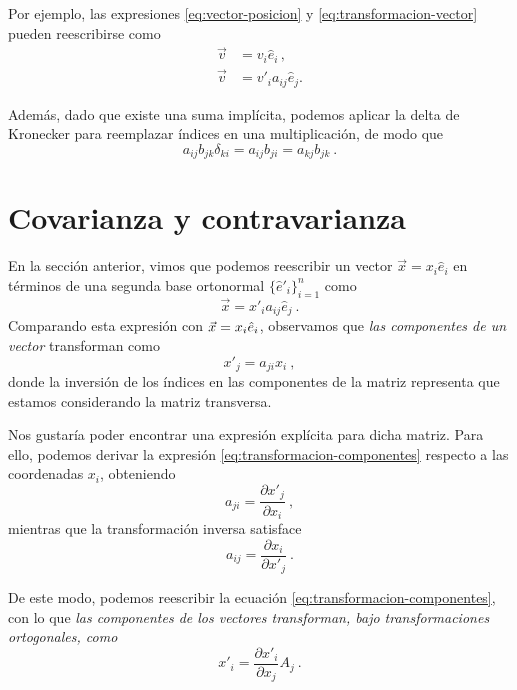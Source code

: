Por ejemplo, las expresiones \eqref{eq:vector-posicion} y \eqref{eq:transformacion-vector} pueden reescribirse como
\begin{align}
    \vec{v} & = v_i \hat{e}_i \, , \\
    \vec{v} & = v'_i a_{ij} \hat{e}_j .
\end{align}

Además, dado que existe una suma implícita, podemos aplicar la delta de Kronecker para reemplazar índices en una multiplicación, de modo que
\begin{equation}
    a_{ij} b_{jk} \delta_{ki} = a_{ij} b_{ji} = a_{kj} b_{jk} \ .
\end{equation}

\section{Covarianza y contravarianza}

En la sección anterior, vimos que podemos reescribir un vector $\vec{x} = x_i \hat{e}_i$ en términos de una segunda base ortonormal $\{\hat{e}'_i\}_{i=1}^n$ como
\begin{equation} \label{eq:transformacion-vector-einstein}
    \vec{x} = x'_i a_{ij} \hat{e}_j \ .
\end{equation}
Comparando esta expresión con $\vec{x} = x_i \hat{e}_i$, observamos que \emph{las componentes de un vector} transforman como
\begin{equation} \label{eq:transformacion-componentes}
    x'_j = a_{ji} x_i \ , 
\end{equation}
donde la inversión de los índices en las componentes de la matriz representa que estamos considerando la matriz transversa.

Nos gustaría poder encontrar una expresión explícita para dicha matriz. Para ello, podemos derivar la expresión \eqref{eq:transformacion-componentes} respecto a las coordenadas $x_i$, obteniendo
\begin{equation}
    a_{ji} = \frac{\partial x'_j}{\partial x_i} \ ,
\end{equation}
mientras que la transformación inversa satisface
\begin{equation}
    a_{ij} = \frac{\partial x_i}{\partial x'_j} \ .
\end{equation}

De este modo, podemos reescribir la ecuación \eqref{eq:transformacion-componentes}, con lo que \emph{las componentes de los vectores transforman, bajo transformaciones ortogonales, como}
\begin{equation}
    x'_i = \frac{\partial x'_i}{\partial x_j} A_j \ .
\end{equation}

